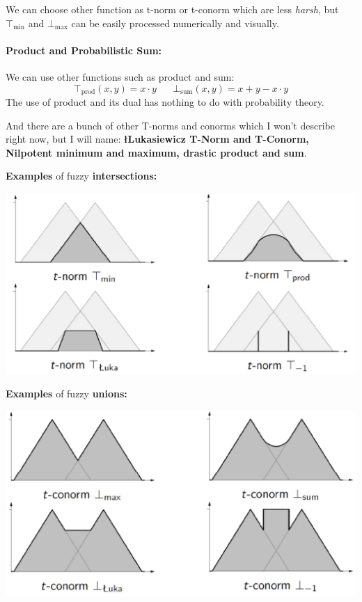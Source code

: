 \documentclass[11pt]{article}
\begin{document}
		We can choose other function as t-norm or t-conorm which are less \textit{harsh}, but $\top_{\min}$ and $\bot_{\max}$ can be easily processed numerically and visually.\\
		
		\paragraph{Product and Probabilistic Sum:} We can use other functions such as product and sum: 
		$$ \top_{\text{prod}} (x,y) = x \cdot y \;\;\;\;\;\; \bot_{\text{sum}} (x,y) = x + y - x \cdot y $$
		The use of product and its dual has nothing to do with probability theory.\\
		
		\vfill 
		
		And there are a bunch of other T-norms and conorms which I won't describe right now, but I will name: \textbf{\l{L}ukasiewicz T-Norm and T-Conorm, Nilpotent minimum and maximum, drastic product and sum}.
		
		\newpage
		
		\textbf{Examples} of fuzzy \textbf{intersections:}
		\begin{center}
			\includegraphics[width=0.9\columnwidth]{img/FS/fint}
		\end{center}
		
		\textbf{Examples} of fuzzy \textbf{unions:}
		\begin{center}
			\includegraphics[width=0.9\columnwidth]{img/FS/funion}
		\end{center}
		
\end{document}
